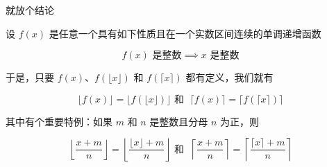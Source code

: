 就放个结论

设 $f(x)$ 是任意一个具有如下性质且在一个实数区间连续的单调递增函数

\[
  f(x) \text{ 是整数} \implies x \text{ 是整数} 
\]

于是，只要 $f(x)$、$f(\lfloor x \rfloor)$ 和 $f(\lceil x \rceil)$ 都有定义，我们就有

\[
  \lfloor f(x) \rfloor = \lfloor f(\lfloor x \rfloor) \rfloor
  \text{ 和 } \;
  \lceil f(x) \rceil = \lceil f(\lceil x \rceil) \rceil
\]

其中有个重要特例：如果 $m$ 和 $n$ 是整数且分母 $n$ 为正，则

\[
\left\lfloor \frac{x + m}{n} \right\rfloor = \left\lfloor \frac{\lfloor x \rfloor + m}{n} \right\rfloor
\text{ 和 } \;
\left\lceil \frac{x + m}{n} \right\rceil = \left\lceil \frac{\lceil x \rceil + m}{n} \right\rceil
\]